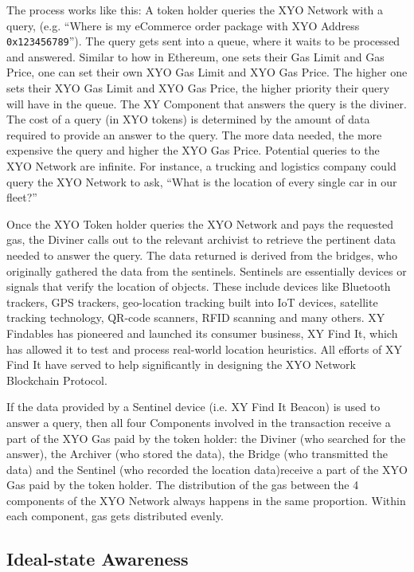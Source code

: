 \documentclass{article}
\begin{document}
The process works like this: A token holder queries the XYO Network with a query, (e.g.
``Where is my eCommerce order package with XYO Address \texttt{0x123456789}''). The query gets sent into a queue, where it waits to be processed and answered. Similar to how in Ethereum, one sets their Gas Limit and Gas Price, one can set their own XYO Gas Limit and XYO Gas Price. The higher one sets their XYO Gas Limit and XYO Gas Price, the higher priority their query will have in the queue. The XY Component that answers the query is the \Gls{diviner}. The cost of a query (in XYO tokens) is determined by the amount of data required to provide an answer to the query.  The more data needed, the more expensive the query and higher the XYO Gas Price. Potential queries to the XYO Network are infinite. For instance, a trucking and logistics company could query the XYO Network to ask, ``What is the location of every single car in our fleet?''

Once the XYO Token holder queries the XYO Network and pays the requested gas, the Diviner calls out to the relevant \Gls{archivist} to retrieve the pertinent data needed to answer the query. The data returned is derived from the \Glspl{bridge}, who originally gathered the data from the \Glspl{sentinel}. Sentinels are essentially devices or signals that verify the location of objects. These include devices like Bluetooth trackers, GPS trackers, geo-location tracking built into IoT devices, satellite tracking technology, QR-code scanners, RFID scanning and many others. XY Findables has pioneered and launched its consumer business, XY Find It, which has allowed it to test and process real-world location heuristics. All efforts of XY Find It have served to help significantly in designing the XYO Network Blockchain Protocol.

If the data provided by a Sentinel device (i.e. XY Find It Beacon) is used to answer a query, then all four Components involved in the transaction receive a part of the XYO Gas paid by the token holder: the Diviner (who searched for the answer), the Archiver (who stored the data), the Bridge (who transmitted the data) and the Sentinel (who recorded the location data)receive a part of the XYO Gas paid by the token holder. The distribution of the gas between the 4 components of the XYO Network always happens in the same proportion.  Within each component, gas gets distributed evenly.

\subsection {Ideal-state Awareness}
\end{document}

